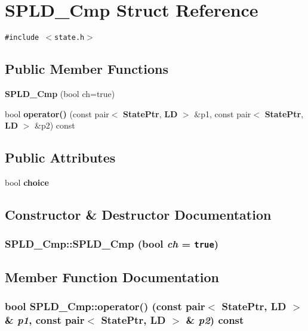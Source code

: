 \section{SPLD\_\-Cmp Struct Reference}
\label{structSPLD__Cmp}
{\tt \#include $<$state.h$>$}

\subsection*{Public Member Functions}
\begin{CompactItemize}
\item 
{\bf SPLD\_\-Cmp} (bool ch=true)
\item 
bool {\bf operator()} (const pair$<$ {\bf StatePtr}, {\bf LD} $>$ \&p1, const pair$<$ {\bf StatePtr}, {\bf LD} $>$ \&p2) const
\end{CompactItemize}
\subsection*{Public Attributes}
\begin{CompactItemize}
\item 
bool {\bf choice}
\end{CompactItemize}


\subsection{Constructor \& Destructor Documentation}
\subsubsection{\setlength{\rightskip}{0pt plus 5cm}SPLD\_\-Cmp::SPLD\_\-Cmp (bool {\em ch} = {\tt true})\hspace{0.3cm}{\tt  [inline]}}\label{structSPLD__Cmp_514695faf99dce5d85134029ec6740a1}




\subsection{Member Function Documentation}
\subsubsection{\setlength{\rightskip}{0pt plus 5cm}bool SPLD\_\-Cmp::operator() (const pair$<$ {\bf StatePtr}, {\bf LD} $>$ \& {\em p1}, const pair$<$ {\bf StatePtr}, {\bf LD} $>$ \& {\em p2}) const\hspace{0.3cm}{\tt  [inline]}}\label{structSPLD__Cmp_577102fd5f0c4104da8ecf3d71eb63d9}




